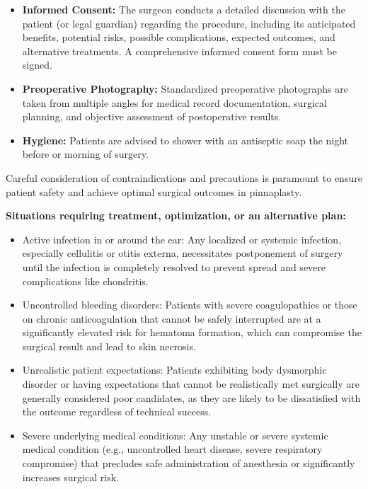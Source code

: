 \begin{itemize}
  \item \textbf{Informed Consent:} The surgeon conducts a detailed discussion with the patient (or legal guardian) regarding the procedure, including its anticipated benefits, potential risks, possible complications, expected outcomes, and alternative treatments. A comprehensive informed consent form must be signed.
  \item \textbf{Preoperative Photography:} Standardized preoperative photographs are taken from multiple angles for medical record documentation, surgical planning, and objective assessment of postoperative results.
  \item \textbf{Hygiene:} Patients are advised to shower with an antiseptic soap the night before or morning of surgery.
\end{itemize}

Careful consideration of contraindications and precautions is paramount to ensure patient safety and achieve optimal surgical outcomes in pinnaplasty.

\textbf{Situations requiring treatment, optimization, or an alternative plan:}
\begin{itemize}
  \item Active infection in or around the ear: Any localized or systemic infection, especially cellulitis or otitis externa, necessitates postponement of surgery until the infection is completely resolved to prevent spread and severe complications like chondritis.
  \item Uncontrolled bleeding disorders: Patients with severe coagulopathies or those on chronic anticoagulation that cannot be safely interrupted are at a significantly elevated risk for hematoma formation, which can compromise the surgical result and lead to skin necrosis.
  \item Unrealistic patient expectations: Patients exhibiting body dysmorphic disorder or having expectations that cannot be realistically met surgically are generally considered poor candidates, as they are likely to be dissatisfied with the outcome regardless of technical success.
  \item Severe underlying medical conditions: Any unstable or severe systemic medical condition (e.g., uncontrolled heart disease, severe respiratory compromise) that precludes safe administration of anesthesia or significantly increases surgical risk.
\end{itemize}

